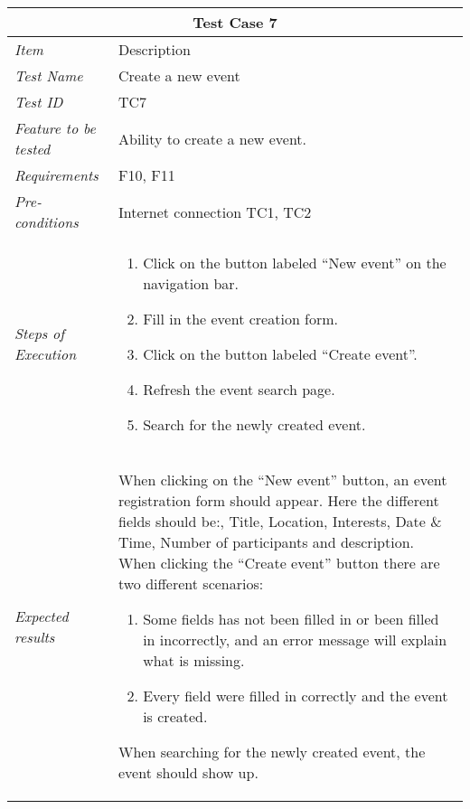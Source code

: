\begin{minipage}{\linewidth}
\setlength{\tabcolsep}{15pt}
\centering
{}
\begin{tabular}{ |l|p{70mm}| }
	\hline
	\multicolumn{2}{|c|}{\cellcolor{gray!25} \textbf{Test Case 7}} \\
	\hline
	\it{\cellcolor{gray!25}Item} & {\cellcolor{gray!25} Description } \\
	\hline
	\it{\cellcolor{gray!25}Test Name } & Create a new event \\ \hline
	\it{\cellcolor{gray!25}Test ID} & TC7 \\ \hline
	\it{\cellcolor{gray!25}Feature to be tested} & Ability to create a new event. \\ \hline
	\it{\cellcolor{gray!25}Requirements} & F10, F11  \\ \hline
	\it{\cellcolor{gray!25}Pre-conditions} & Internet connection TC1, TC2  \\ \hline
	\it{\cellcolor{gray!25}Steps of Execution} & \begin{enumerate}
	                                       \item Click on the button labeled “New event” on the navigation bar.
	                                       \item Fill in the event creation form.
	                                       \item Click on the button labeled “Create event”.
	                                       \item Refresh the event search page.
	                                       \item Search for the newly created event.
	                                     \end{enumerate} \\ \hline
	\it{\cellcolor{gray!25}Expected results} & When clicking on the ``New event'' button, an event registration form should appear. Here the different fields should be:, Title, Location, Interests, Date \& Time, Number of participants and description. When clicking the ``Create event'' button there are two different scenarios: 
	\begin{enumerate}[label=\alph*)]
	                                       \item Some fields has not been filled in or been filled in incorrectly, and an error message will explain what is missing.
	                                       \item Every field were filled in correctly and the event is created.
	                                     \end{enumerate} 
	                                     When searching for the newly created event, the event should show up. \\
	\hline
\end{tabular}
\medskip
\end{minipage}
